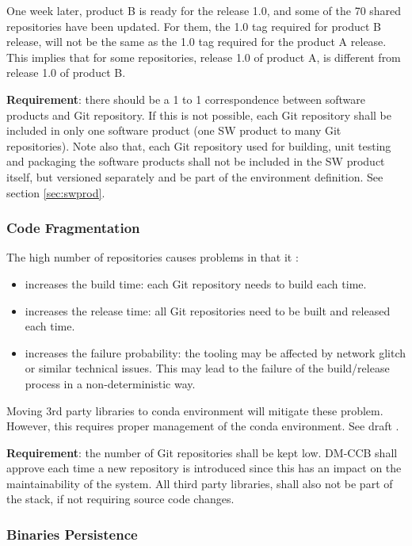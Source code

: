 One week later, product B is ready for the release 1.0, and some of the 70 shared repositories have been updated.
For them, the 1.0 tag required for product B release, will not be the same as the 1.0 tag required for the product A release.
This implies that for some repositories, release 1.0 of product A, is different from release 1.0 of product B.

\textbf{Requirement}: there should be a 1 to 1 correspondence between software products and Git repository. 
If this is not possible, each Git repository shall be included in only one software product (one SW product to many Git repositories).
Note also that, each Git repository used for building, unit testing and packaging the software products shall not be included in the SW product itself, but versioned separately and be part of the environment definition. See section \ref{sec:swprod}.


\subsubsection{Code Fragmentation} \label{sec:problemCode}

The high number of repositories causes problems in that it :

\begin{itemize}
\item increases the build time: each Git repository needs to build each time.
\item increases the release time: all Git repositories need to be built and released each time.
\item increases the failure probability: the tooling may be affected by network glitch or similar technical issues. 
This may lead to the failure of the build/release process in a non-deterministic way.
\end{itemize}

Moving 3rd party libraries to conda environment will mitigate these problem. 
However, this requires proper management of the conda environment. See draft .

\textbf{Requirement}: the number of Git repositories shall be kept low. DM-CCB shall approve each time a new repository is introduced since this has an impact on the maintainability of the system. 
All third party libraries, shall also not be part of the stack, if not requiring source code changes.


\subsubsection{Binaries Persistence} \label{sec:problemPersistence}

